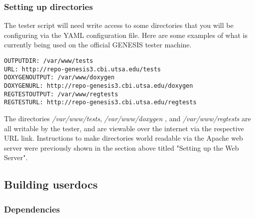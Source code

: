 \documentclass[12pt]{article}
\begin{document}
\subsubsection*{Setting up directories}

The tester script will need write access to some directories that you will be configuring via the YAML configuration file. Here are some examples of what is currently being used on the official GENESIS tester machine. 

\begin{verbatim}
OUTPUTDIR: /var/www/tests
URL: http://repo-genesis3.cbi.utsa.edu/tests
DOXYGENOUTPUT: /var/www/doxygen
DOXYGENURL: http://repo-genesis3.cbi.utsa.edu/doxygen
REGTESTOUTPUT: /var/www/regtests
REGTESTURL: http://repo-genesis3.cbi.utsa.edu/regtests
\end{verbatim}

The directories {\it /var/www/tests}, {\it /var/www/doxygen} , and {\it /var/www/regtests} are all writable by the tester, and are viewable over the internet via the respective URL link. Instructions to make directories world readable via the Apache web server were previously shown in the section above titled "Setting up the Web Server". 

\subsection*{Building userdocs}

\subsubsection*{Dependencies}
\end{document}
